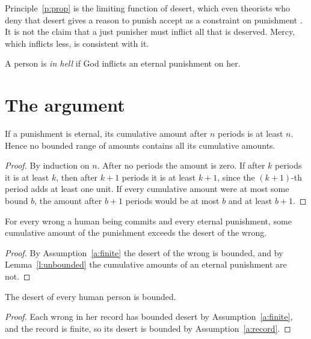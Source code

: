 \documentclass{situationist-preprint}
\begin{document}
Principle~\ref{p:prop} is the limiting function of desert, which even theorists who deny that desert gives a reason to punish accept as a constraint on punishment \citep{vonHirsch1993}. It is not the claim that a just punisher must inflict all that is deserved. Mercy, which inflicts less, is consistent with it.

\begin{definition}[Hell]\label{d:hell}
A person is \emph{in hell} if God inflicts an eternal punishment on her.
\end{definition}

\section{The argument}

\begin{lemma}\label{l:unbounded}
If a punishment is eternal, its cumulative amount after $n$ periods is at least $n$. Hence no bounded range of amounts contains all its cumulative amounts.
\end{lemma}

\begin{proof}
By induction on $n$. After no periods the amount is zero. If after $k$ periods it is at least $k$, then after $k + 1$ periods it is at least $k + 1$, since the $(k+1)$-th period adds at least one unit. If every cumulative amount were at most some bound $b$, the amount after $b + 1$ periods would be at most $b$ and at least $b + 1$.
\end{proof}

\begin{proposition}\label{p:nowrong}
For every wrong a human being commits and every eternal punishment, some cumulative amount of the punishment exceeds the desert of the wrong.
\end{proposition}

\begin{proof}
By Assumption~\ref{a:finite} the desert of the wrong is bounded, and by Lemma~\ref{l:unbounded} the cumulative amounts of an eternal punishment are not.
\end{proof}

\begin{lemma}\label{l:person}
The desert of every human person is bounded.
\end{lemma}

\begin{proof}
Each wrong in her record has bounded desert by Assumption~\ref{a:finite}, and the record is finite, so its desert is bounded by Assumption~\ref{a:record}.
\end{proof}
\end{document}
